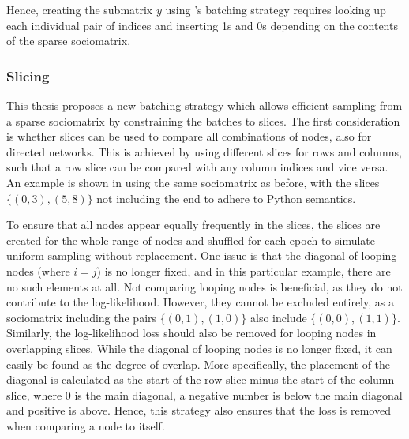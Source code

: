         Hence, creating the submatrix $y$ using \citeauthor{jacobsen2018a}'s batching strategy requires looking up each individual pair of indices and inserting 1s and 0s depending on the contents of the sparse sociomatrix.
    
    \subsubsection{Slicing}
    
        This thesis proposes a new batching strategy which allows efficient sampling from a sparse sociomatrix by constraining the batches to slices. The first consideration is whether slices can be used to compare all combinations of nodes, also for directed networks.
        This is achieved by using different slices for rows and columns, such that a row slice can be compared with any column indices and vice versa. An example is shown in  using the same sociomatrix as before, with the slices $\{(0,3), (5,8)\}$ not including the end to adhere to Python semantics.
        
        To ensure that all nodes appear equally frequently in the slices, the slices are created for the whole range of nodes and shuffled for each epoch to simulate uniform sampling without replacement.
        One issue is that the diagonal of looping nodes (where $i=j$) is no longer fixed, and in this particular example, there are no such elements at all. Not comparing looping nodes is beneficial, as they do not contribute to the log-likelihood. However, they cannot be excluded entirely, as a sociomatrix including the pairs $\{(0,1), (1,0)\}$ also include $\{(0,0), (1,1)\}$. Similarly, the log-likelihood loss should also be removed for looping nodes in overlapping slices.
        While the diagonal of looping nodes is no longer fixed, it can easily be found as the degree of overlap. More specifically, the placement of the diagonal is calculated as the start of the row slice minus the start of the column slice, where 0 is the main diagonal, a negative number is below the main diagonal and positive is above. Hence, this strategy also ensures that the loss is removed when comparing a node to itself.
        
